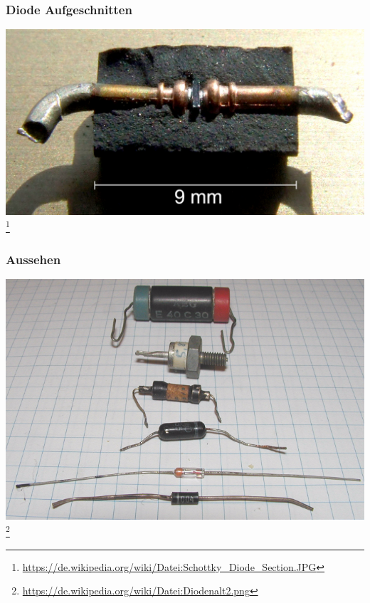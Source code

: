 \begin{frame}
    \frametitle{Diode Aufgeschnitten}
    \begin{center}
        \includegraphics[width=1\textwidth]{e12/Schottky_Diode_Section.jpg}
        \footnote{\tiny \url{https://de.wikipedia.org/wiki/Datei:Schottky_Diode_Section.JPG}}
	\end{center}
\end{frame}

\begin{frame}
    \frametitle{Aussehen}
    \begin{center}
        \includegraphics[width=.8\textwidth]{e12/Diodenalt2.png}
        \footnote{\tiny \url{https://de.wikipedia.org/wiki/Datei:Diodenalt2.png}}
	\end{center}
\end{frame}


